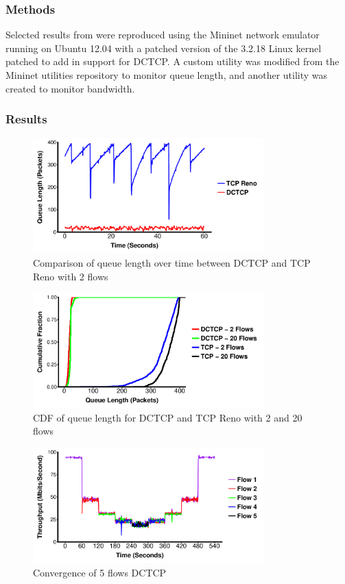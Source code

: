 \subsubsection{Methods}

Selected results from \cite{alizadeh_data_2010} were reproduced using the Mininet network emulator running on Ubuntu 12.04 with a patched version of the 3.2.18 Linux kernel patched to add in support for DCTCP. A custom utility was modified from the Mininet utilities repository to monitor queue length, and another utility was created to monitor bandwidth. 

\subsubsection{Results}

\begin{figure}
\includegraphics[height=1.75in,width=3.5in]{queue_2_flows}
\caption{Comparison of queue length over time between DCTCP and TCP Reno with 2 flows}
\end{figure}

\begin{figure}
\includegraphics[height=1.75in,width=3.5in]{queue_cdf}
\caption{CDF of queue length for DCTCP and TCP Reno with 2 and 20 flows}
\end{figure}

\begin{figure}
\includegraphics[height=1.75in,width=3.5in]{dctcp_converg}
\caption{Convergence of 5 flows DCTCP}
\end{figure}

